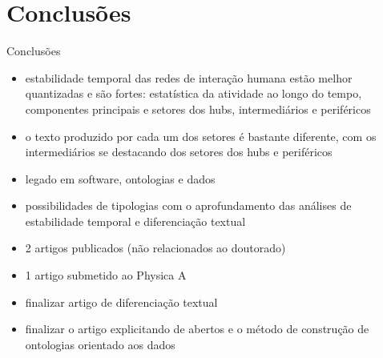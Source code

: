\documentclass[10pt]{beamer}
\begin{document}
\section{Conclusões}
\begin{frame}{Conclusões}
\begin{itemize}
	\item estabilidade temporal das redes de interação humana estão melhor quantizadas e são fortes: estatística da atividade ao longo do tempo, componentes principais e setores dos hubs, intermediários e periféricos
	\item o texto produzido por cada um dos setores é bastante diferente, com os intermediários se destacando dos setores dos hubs e periféricos
	\item legado em software, ontologias e dados
	\item possibilidades de tipologias com o aprofundamento das análises de estabilidade temporal e diferenciação textual
	\item 2 artigos publicados (não relacionados ao doutorado)
	\item 1 artigo submetido ao Physica A
	\item finalizar artigo de diferenciação textual
	\item finalizar o artigo explicitando de abertos e o método de construção de ontologias orientado aos dados
\end{itemize}
\end{frame}
\end{document}
